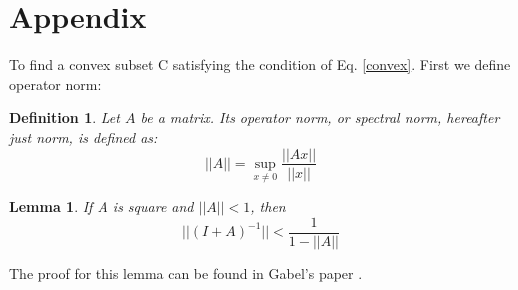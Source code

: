 \documentclass[11pt,twocolumn,varwidth=true,a4paper,fleqn]{article}
\newtheorem{lemma}{Lemma}
\newtheorem{definition}{Definition}
\begin{document}
\clearpage
\appendix
\section{Appendix} \label{AppendixA}
To find a convex subset C satisfying the condition of Eq. \ref{convex}. 
First we define operator norm:
\begin{definition}
Let $A$ be a matrix. Its operator norm, or
spectral norm, hereafter just norm, is defined as:
\begin{equation*}
||A|| = \sup_{x \neq 0}\frac{||Ax||}{||x||} 
\end{equation*}
\end{definition}

\begin{lemma} \label{lemma:newman}
If A is square and $||A|| < 1$, then
\begin{equation*}
||(I+A)^{-1}|| < \frac{1}{1-||A||}
\end{equation*}
\end{lemma}
The proof for this lemma can be found in Gabel's paper
\cite{gabel2015monitoring}.
\end{document}

